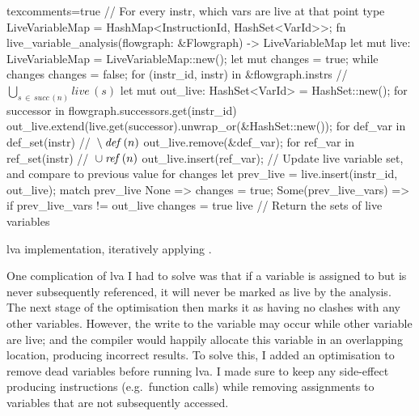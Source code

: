 \documentclass[00-main.tex]{subfiles}
\begin{document}
\begin{listing}[!t]
  \begin{RustListing*}{texcomments=true}
    // For every instr, which vars are live at that point
    type LiveVariableMap = HashMap<InstructionId, HashSet<VarId>>;
    fn live_variable_analysis(flowgraph: &Flowgraph) -> LiveVariableMap {
        let mut live: LiveVariableMap = LiveVariableMap::new();
        let mut changes = true;
        while changes {
            changes = false;
            for (instr_id, instr) in &flowgraph.instrs {
                // $\bigcup_{s \,\in\, \mathit{succ}\,(n)} \mathit{live}\,(s)$
                let mut out_live: HashSet<VarId> = HashSet::new();
                for successor in flowgraph.successors.get(instr_id) {
                    out_live.extend(live.get(successor).unwrap_or(&HashSet::new());
                }
                for def_var in def_set(instr) { // ${} \setminus \lvadef\,(n)$
                    out_live.remove(&def_var);
                }
                for ref_var in ref_set(instr) { // ${} \cup \lvaref\,(n)$
                    out_live.insert(ref_var);
                }
                // Update live variable set, and compare to previous value for changes
                let prev_live = live.insert(instr_id, out_live);
                match prev_live {
                    None => {
                        changes = true;
                    }
                    Some(prev_live_vars) => {
                        if prev_live_vars != out_live {
                            changes = true
                        }
                    }
                }
            }
        }
        live // Return the sets of live variables
    }
  \end{RustListing*}
  \caption{\Acrlong{lva} implementation, iteratively applying .}%
  \label{lst:lva implementation}
\end{listing}

One complication of \gls{lva} I had to solve was that if a variable is assigned to but is never subsequently referenced, it will never be marked as live by the analysis.
The next stage of the optimisation then marks it as having no clashes with any other variables.
However, the write to the variable may occur while other variable are live; and the compiler would happily allocate this variable in an overlapping location, producing incorrect results.
To solve this, I added an optimisation to remove dead variables before running \gls{lva}.
I made sure to keep any side-effect producing instructions (e.g.~function calls) while removing assignments to variables that are not subsequently accessed.
\end{document}
